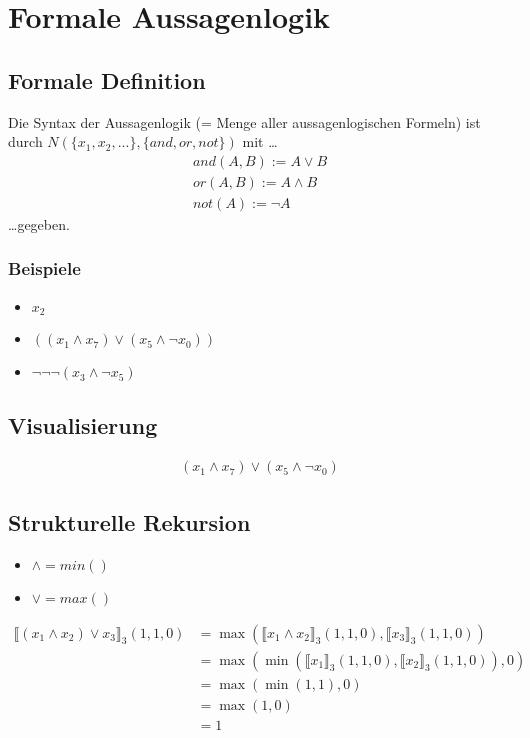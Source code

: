 \section{Formale Aussagenlogik}

\subsection{Formale Definition}
Die Syntax der Aussagenlogik (= Menge aller aussagenlogischen Formeln) ist
durch $N(\{x_1,x_2,...\},\{and,or,not\})$ mit \dots
\begin{align*}
	and(A,B) := A \vee B  \\
	or(A,B) := A \wedge B \\
	not(A) := \neg A
\end{align*}
\dots gegeben.
\subsubsection{Beispiele}
\begin{itemize}
	\item $x_2$
	\item $((x_1 \wedge x_7) \vee (x_5 \wedge \neg x_0))$
	\item $\neg\neg\neg(x_3 \wedge \neg x_5)$
\end{itemize}
\subsection{Visualisierung}

\begin{align*}
	(x_1 \wedge x_7) \vee (x_5 \wedge \neg x_0)
\end{align*}

\begin{center}
\end{center}
\subsection{Strukturelle Rekursion}
\begin{itemize}
    \item $\wedge = min()$
    \item $\vee = max()$
\end{itemize}
\begin{align*}
    \llbracket(x_1 \wedge x_2) \vee x_3\rrbracket_3(1, 1, 0) &= \max(\llbracket x_1 \wedge x_2\rrbracket_3(1, 1, 0), \llbracket x_3\rrbracket_3(1, 1, 0)) \\
    &= \max(\min(\llbracket x_1\rrbracket_3(1, 1, 0), \llbracket x_2\rrbracket_3(1, 1, 0)), 0) \\
    &= \max(\min(1, 1), 0) \\
    &= \max(1, 0) \\
    &= 1
\end{align*}
